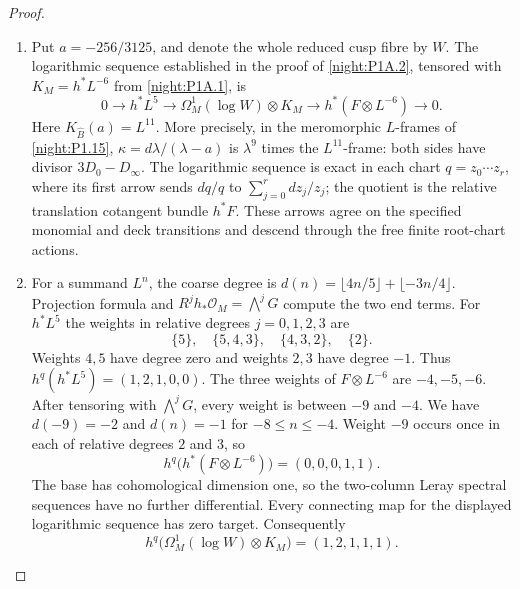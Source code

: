 \documentclass[11pt,a4paper]{article}
\theoremstyle{definition}
\begin{document}
\begin{proof}
\begin{enumerate}[label=\arabic*.]
\item Put $a=-256/3125$, and denote the whole reduced cusp fibre by
$W$.  The logarithmic sequence established in the proof of
\cref{night:P1A.2}, tensored with $K_M=h^*L^{-6}$ from
\cref{night:P1A.1}, is
\[
0\longrightarrow h^*L^5
\longrightarrow\Omega^1_M(\log W)\otimes K_M
\longrightarrow h^*(F\otimes L^{-6})\longrightarrow0.
\]
Here $K_{\widehat B}(a)=L^{11}$.  More precisely, in the meromorphic
$L$-frames of \cref{night:P1.15},
$\kappa=d\lambda/(\lambda-a)$ is $\lambda^9$ times the
$L^{11}$-frame: both sides have divisor $3D_0-D_\infty$.
The logarithmic sequence is exact in each chart
$q=z_0\cdots z_r$, where its first arrow sends $dq/q$ to
$\sum_{j=0}^r dz_j/z_j$; the quotient is the relative translation
cotangent bundle $h^*F$.  These arrows agree on the specified
monomial and deck transitions and descend through the free finite
root-chart actions.

\item For a summand $L^n$, the coarse degree is
$d(n)=\lfloor4n/5\rfloor+\lfloor-3n/4\rfloor$.
Projection formula and
$R^jh_*\mathcal O_M=\bigwedge^jG$ compute the two end terms.
For $h^*L^5$ the weights in relative degrees $j=0,1,2,3$ are
\[
\{5\},\quad\{5,4,3\},\quad\{4,3,2\},\quad\{2\}.
\]
Weights $4,5$ have degree zero and weights $2,3$ have degree $-1$.
Thus $h^q(h^*L^5)=(1,2,1,0,0)$.
The three weights of $F\otimes L^{-6}$ are $-4,-5,-6$.
After tensoring with $\bigwedge^jG$, every weight is between
$-9$ and $-4$.  We have $d(-9)=-2$ and $d(n)=-1$ for
$-8\le n\le-4$.  Weight $-9$ occurs once in each of relative
degrees $2$ and $3$, so
\[
h^q\bigl(h^*(F\otimes L^{-6})\bigr)=(0,0,0,1,1).
\]
The base has cohomological dimension one, so the two-column Leray
spectral sequences have no further differential.  Every connecting
map for the displayed logarithmic sequence has zero target.
Consequently
\[
h^q\bigl(\Omega^1_M(\log W)\otimes K_M\bigr)=(1,2,1,1,1).
\]


\end{enumerate}
\end{proof}
\end{document}
